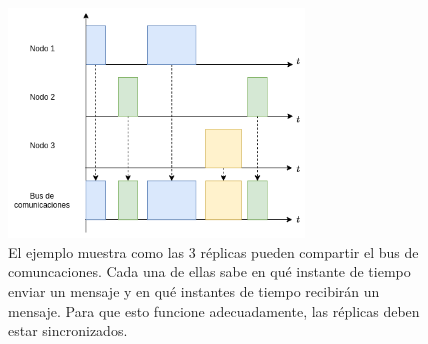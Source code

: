 \begin{figure}[H]
    \centering
    \includegraphics[width=0.7\textwidth]{img/TDMA_esquema.png}
    \caption{El ejemplo muestra como las 3 réplicas pueden compartir el bus de comuncaciones. Cada una de ellas sabe en qué instante de tiempo enviar un mensaje y en qué instantes de tiempo recibirán un mensaje. Para que esto funcione adecuadamente, las réplicas deben estar sincronizados.}
    \label{fig:TDMA_esquema}
\end{figure}







